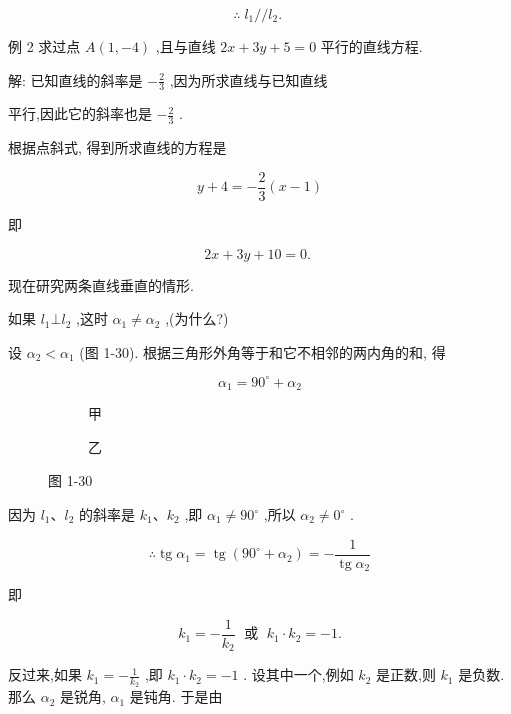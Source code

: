 \documentclass[lang=cn,newtx,12pt,scheme=chinese]{elegantbook}
\begin{document}
\[
  \therefore \;{l}_{1}//{l}_{2}\text{. }
\]

例 2 求过点 \(A\left( {1, - 4}\right)\) ,且与直线 \({2x} + {3y} + 5 = 0\) 平行的直线方程.

解: 已知直线的斜率是 \(- \frac{2}{3}\) ,因为所求直线与已知直线

平行,因此它的斜率也是 \(- \frac{2}{3}\) .

根据点斜式, 得到所求直线的方程是

\[
  y + 4 = - \frac{2}{3}\left( {x - 1}\right)
\]

即

\[
    {2x} + {3y} + {10} = 0\text{. }
\]

现在研究两条直线垂直的情形.

如果 \({l}_{1} \bot {l}_{2}\) ,这时 \({\alpha }_{1} \neq {\alpha }_{2}\) ,(为什么?)

设 \({\alpha }_{2} < {\alpha }_{1}\) (图 1-30). 根据三角形外角等于和它不相邻的两内角的和, 得

\[
    {\alpha }_{1} = {90}^{ \circ } + {\alpha }_{2}
\]

\begin{figure}[h]
	\centering
	\begin{subfigure}[h]{0.45\textwidth}
		\centering
		
		\caption{甲}
	\end{subfigure}
	\hfill %
	\begin{subfigure}[h]{0.45\textwidth}
		\centering
		
		\caption{乙}
	\end{subfigure}
	\caption{图 1-30}
\end{figure}

因为 \({l}_{1}\text{、}{l}_{2}\) 的斜率是 \({k}_{1}\text{、}{k}_{2}\) ,即 \({\alpha }_{1} \neq {90}^{ \circ }\) ,所以 \({\alpha }_{2} \neq {0}^{ \circ }\) .

\[
  \therefore \operatorname{tg}{\alpha }_{1} = \operatorname{tg}\left( {{90}^{ \circ } + {\alpha }_{2}}\right) = - \frac{1}{\operatorname{tg}{\alpha }_{2}}
\]

即

\[
    {k}_{1} = - \frac{1}{{k}_{2}}\;\text{ 或 }\;{k}_{1} \cdot {k}_{2} = - 1.
\]

反过来,如果 \({k}_{1} = - \frac{1}{{k}_{2}}\) ,即 \({k}_{1} \cdot {k}_{2} = - 1\) . 设其中一个,例如 \({k}_{2}\) 是正数,则 \({k}_{1}\) 是负数. 那么 \({\alpha }_{2}\) 是锐角, \({\alpha }_{1}\) 是钝角. 于是由
\end{document}
